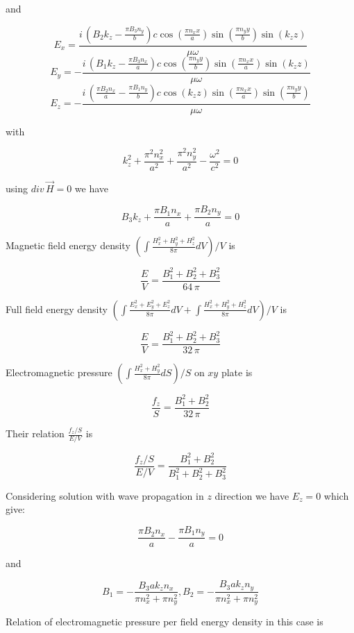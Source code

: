 \documentclass[11pt]{article}
\begin{document}
    and

\[E_{x} = \frac{i \, {\left(B_{2} k_{z} - \frac{\pi B_{3} n_{y}}{b}\right)} c \cos\left(\frac{\pi n_{x} x}{a}\right) \sin\left(\frac{\pi n_{y} y}{b}\right) \sin\left(k_{z} z\right)}{\mu \omega}\]
\[E_{y} = -\frac{i \, {\left(B_{1} k_{z} - \frac{\pi B_{3} n_{x}}{a}\right)} c \cos\left(\frac{\pi n_{y} y}{b}\right) \sin\left(\frac{\pi n_{x} x}{a}\right) \sin\left(k_{z} z\right)}{\mu \omega}\]
\[E_{z} = -\frac{i \, {\left(\frac{\pi B_{2} n_{x}}{a} - \frac{\pi B_{1} n_{y}}{b}\right)} c \cos\left(k_{z} z\right) \sin\left(\frac{\pi n_{x} x}{a}\right) \sin\left(\frac{\pi n_{y} y}{b}\right)}{\mu \omega}\]

    with

\[k_{z}^{2} + \frac{\pi^{2} n_{x}^{2}}{a^{2}} + \frac{\pi^{2} n_{y}^{2}}{a^{2}} - \frac{\omega^{2}}{c^{2}} = 0\]

    using \(div\,\vec{H} = 0\) we have

\[B_{3} k_{z} + \frac{\pi B_{1} n_{x}}{a} + \frac{\pi B_{2} n_{y}}{a} = 0\]

    Magnetic field energy density
\(\left(\int \frac{H_x^2+H_y^2+H_z^2}{8 \pi}dV\right)\big/{V}\) is

\[\frac{E}{V} = \frac{{B_{1}^{2} + B_{2}^{2} + B_{3}^{2}}}{64 \, \pi}\]

    Full field energy density
\(\left(\int \frac{E_x^2+E_y^2+E_z^2}{8 \pi}dV + \int \frac{H_x^2+H_y^2+H_z^2}{8 \pi}dV\right)\big/{V}\)
is

    \[\frac{E}{V} = \frac{{B_{1}^{2} + B_{2}^{2} + B_{3}^{2}}}{32 \, \pi}\]

    Electromagnetic pressure
\(\left({\int \frac {H_x^2+H_y^2}{8 \pi} dS}\right)\big/{S}\) on \(xy\)
plate is

\[\frac{f_z}{S}=\frac{{B_{1}^{2} + B_{2}^{2}}}{32 \, \pi}\]

Their relation \(\frac{f_z/S}{E/V}\) is

\[\frac{f_z/S}{E/V} = \frac{{B_{1}^{2} + B_{2}^{2}}}{B_{1}^{2} + B_{2}^{2} + B_{3}^{2}}\]

Considering solution with wave propagation in \(z\) direction we have
\(E_z = 0\) which give:

\[\frac{\pi B_{2} n_{x}}{a} - \frac{\pi B_{1} n_{y}}{a} = 0\]

and

\[B_1 = -\frac{B_{3} a k_{z} n_{x}}{\pi n_{x}^{2} + \pi n_{y}^{2}},
B_2 = -\frac{B_{3} a k_{z} n_{y}}{\pi n_{x}^{2} + \pi n_{y}^{2}}\]

Relation of electromagnetic pressure per field energy density in this
case is
\end{document}

